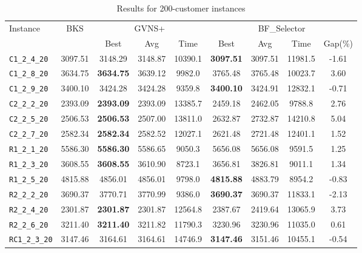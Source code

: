 \begin{table}[ht]
\centering
\small
\setlength{\tabcolsep}{5pt}
\caption{Results for 200-customer instances}
\vspace{4mm}
\begin{adjustbox}{width=\textwidth}
\begin{tabular}{l c c c c @{\hspace{8pt}} c c c c @{\hspace{8pt}}}
\toprule
\multirow{2}{*}{Instance} & \multirow{2}{*}{BKS} & \multicolumn{3}{c}{GVNS+} & \multicolumn{4}{c}{BF\_Selector} \\
\cmidrule(lr){3-5} \cmidrule(lr){6-9}
 &  & Best & Avg & Time & Best & Avg & Time & Gap(\%) \\
\midrule
\texttt{C1\_2\_4\_20} & 3097.51 & 3148.29 & 3148.87 & 10390.1 & \textbf{3097.51} & 3097.51 & 11981.5 & -1.61 \\
\texttt{C1\_2\_8\_20} & 3634.75 & \textbf{3634.75} & 3639.12 & 9982.0 & 3765.48 & 3765.48 & 10023.7 & 3.60 \\
\texttt{C1\_2\_9\_20} & 3400.10 & 3424.28 & 3424.28 & 9359.8 & \textbf{3400.10} & 3424.91 & 12832.1 & -0.71 \\
\texttt{C2\_2\_2\_20} & 2393.09 & \textbf{2393.09} & 2393.09 & 13385.7 & 2459.18 & 2462.05 & 9788.8 & 2.76 \\
\texttt{C2\_2\_5\_20} & 2506.53 & \textbf{2506.53} & 2507.00 & 13811.0 & 2632.87 & 2732.87 & 14210.8 & 5.04 \\
\texttt{C2\_2\_7\_20} & 2582.34 & \textbf{2582.34} & 2582.52 & 12027.1 & 2621.48 & 2721.48 & 12401.1 & 1.52 \\
\texttt{R1\_2\_1\_20} & 5586.30 & \textbf{5586.30} & 5586.65 & 9050.3 & 5656.08 & 5656.08 & 9591.5 & 1.25 \\
\texttt{R1\_2\_3\_20} & 3608.55 & \textbf{3608.55} & 3610.90 & 8723.1 & 3656.81 & 3826.81 & 9011.1 & 1.34 \\
\texttt{R1\_2\_5\_20} & 4815.88 & 4856.01 & 4856.01 & 9798.0 & \textbf{4815.88} & 4883.79 & 8954.2 & -0.83 \\
\texttt{R2\_2\_2\_20} & 3690.37 & 3770.71 & 3770.99 & 9386.0 & \textbf{3690.37} & 3690.37 & 11833.1 & -2.13 \\
\texttt{R2\_2\_4\_20} & 2301.87 & \textbf{2301.87} & 2301.87 & 12564.8 & 2387.67 & 2419.64 & 13065.9 & 3.73 \\
\texttt{R2\_2\_6\_20} & 3211.40 & \textbf{3211.40} & 3211.82 & 11790.3 & 3230.96 & 3230.96 & 11035.0 & 0.61 \\
\texttt{RC1\_2\_3\_20} & 3147.46 & 3164.61 & 3164.61 & 14746.9 & \textbf{3147.46} & 3151.46 & 10455.1 & -0.54 \\

\end{tabular}
\end{adjustbox}
\end{table}
